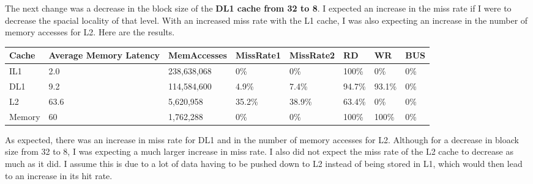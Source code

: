 \documentclass[12pt]{article}
\begin{document}
The next change was a decrease in the block size of the \textbf{DL1 cache from 32 to 8}. I expected an increase in the miss rate if I were to decrease the spacial locality of that level. With an increased miss rate with the L1 cache, I was also expecting an increase in the number of memory accesses for L2. Here are the results.
\begin{table}[!h]
\centering
\begin{tabular}{|l|l|l|l|l|l|l|l|}
\hline
\rowcolor[HTML]{C0C0C0} 
Cache & Average Memory Latency & MemAccesses & MissRate1 & MissRate2 & RD & WR & BUS \\ \hline
IL1 & 2.0 & 238,638,068 & 0\% & 0\% & 100\% & 0\% & 0\% \\ \hline
DL1 & 9.2 & 114,584,600 & 4.9\% & 7.4\% & 94.7\% & 93.1\% & 0\% \\ \hline
L2 & 63.6 & 5,620,958 & 35.2\% & 38.9\% & 63.4\% & 0\% & 0\% \\ \hline
Memory & 60 & 1,762,288 & 0\% & 0\% & 100\% & 100\% & 0\% \\ \hline
\end{tabular}
\end{table}
As expected, there was an increase in miss rate for DL1 and in the number of memory accesses for L2. Although for a decrease in bloack size from 32 to 8, I was expecting a much larger increase in miss rate. I also did not expect the miss rate of the L2 cache to decrease as much as it did. I assume this is due to a lot of data having to be pushed down to L2 instead of being stored in L1, which would then lead to an increase in its hit rate.
\newpage
\end{document}
